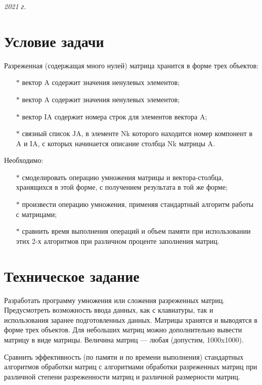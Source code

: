 \documentclass[a4paper,12pt]{extarticle}
\begin{document}
\vspace{7cm}
\begin{center} \textit{2021 г.} \end{center}
\thispagestyle{empty}
\newpage

\tableofcontents
\newpage

\section{Условие задачи}
Разреженная (содержащая много нулей) матрица хранится в форме трех объектов: 
\begin{itemize}
    \item[$*$] вектор A содержит значения ненулевых элементов;
    \item[$*$] вектор A содержит значения ненулевых элементов;
    \item[$*$] вектор IA содержит номера строк для элементов вектора A;
    \item[$*$] связный список JA, в элементе Nk которого находится номер компонент в A и IA, с которых начинается описание столбца Nk матрицы A.
\end{itemize}

Необходимо:
\begin{enumerate}
    \item[$*$] смоделировать операцию умножения матрицы и вектора-столбца, хранящихся в этой форме, с получением результата в той же форме;
    \item[$*$] произвести операцию умножения, применяя стандартный алгоритм работы с матрицами;
    \item[$*$] сравнить время выполнения операций и объем памяти при использовании этих 2-х алгоритмов при различном проценте заполнения матриц.
\end{enumerate}

\newpage

\section{Техническое задание}
Разработать программу умножения или сложения разреженных матриц. Предусмотреть возможность ввода данных, как с клавиатуры, так и использования заранее подготовленных данных. Матрицы хранятся и выводятся в форме трех объектов. Для небольших матриц можно дополнительно вывести матрицу в виде матрицы. Величина матриц --- любая (допустим, 1000x1000). 

Сравнить эффективность (по памяти и по времени выполнения) стандартных алгоритмов обработки матриц с алгоритмами обработки разреженных матриц при различной степени разреженности матриц и различной размерности матриц.
\end{document}
